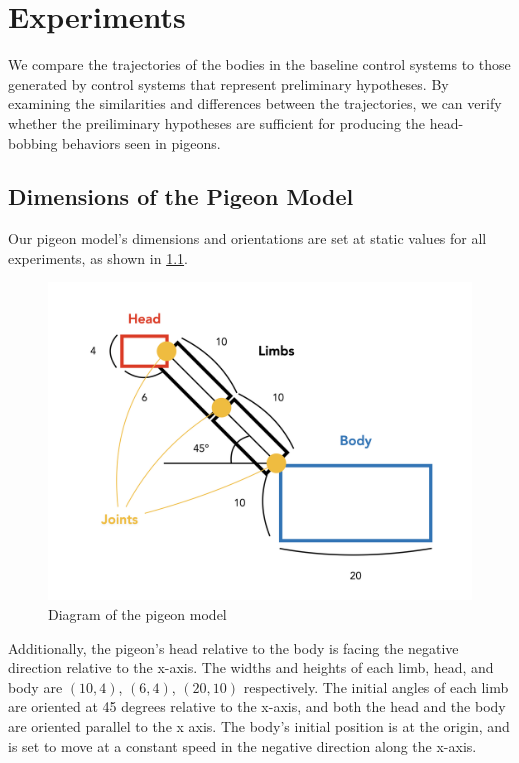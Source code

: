 \chapter{Experiments}
We compare the trajectories of the bodies in the baseline control systems to those generated by control systems that represent preliminary hypotheses. By examining the similarities and differences between the trajectories, we can verify whether the preiliminary hypotheses are sufficient for producing the head-bobbing behaviors seen in pigeons.

\section{Dimensions of the Pigeon Model}
  Our pigeon model's dimensions and orientations are set at static values for all experiments, as shown in \ref{fig:pigeon_dimension}.
    \begin{figure}[H]
        \centering
        \includegraphics[width=1\textwidth]{figures/pigeon_diagram/pigeon_diagram_001.png}
        \caption{Diagram of the pigeon model}
        \label{fig:pigeon_dimension}
    \end{figure}
  Additionally, the pigeon's head relative to the body is facing the negative direction relative to the x-axis.
  The widths and heights of each limb, head, and body are $(10, 4)$, $(6, 4)$, $(20, 10)$ respectively.
  The initial angles of each limb are oriented at 45 degrees relative to the x-axis, and both the head and the body are oriented parallel to the x axis.
  The body's initial position is at the origin, and is set to move at a constant speed in the negative direction along the x-axis.

